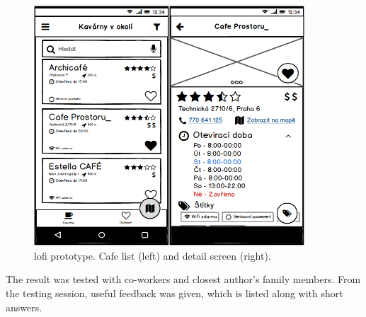 \begin{figure}[htp]
    \centering
    \includegraphics[width=0.9\textwidth]{img/analysis/lofi.png}
    \caption{\gls{lofi} prototype. Cafe list (left) and detail screen (right).}
    \label{fig:lofi}
\end{figure}

The result was tested with co-workers and closest author's family members. From the testing session, useful feedback was given, which is listed along with short answers. 

